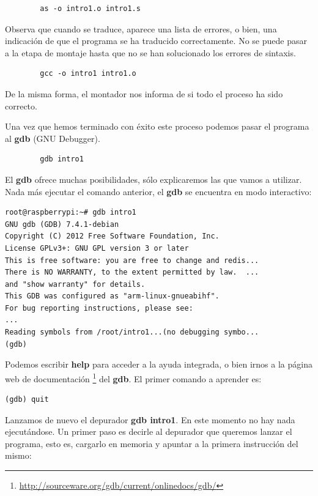 \begin{lstlisting}
        as -o intro1.o intro1.s
\end{lstlisting}

Observa que cuando se traduce, aparece una lista de errores, o bien, una
indicación de que el programa se ha traducido correctamente.
No se puede pasar a la etapa de montaje hasta que no se han solucionado
los errores de sintaxis.

\begin{lstlisting}
        gcc -o intro1 intro1.o
\end{lstlisting}

De la misma forma, el montador nos informa de si todo el proceso ha sido
correcto.

Una vez que hemos terminado con éxito este proceso podemos pasar el programa al
{\bf gdb} (GNU Debugger).

\begin{lstlisting}
        gdb intro1
\end{lstlisting}

El {\bf gdb} ofrece muchas posibilidades, sólo explicaremos las que vamos
a utilizar. Nada más ejecutar el comando anterior, el {\bf gdb} se encuentra
en modo interactivo:

\begin{lstlisting}
root@raspberrypi:~# gdb intro1
GNU gdb (GDB) 7.4.1-debian
Copyright (C) 2012 Free Software Foundation, Inc.
License GPLv3+: GNU GPL version 3 or later 
This is free software: you are free to change and redis...
There is NO WARRANTY, to the extent permitted by law.  ...
and "show warranty" for details.
This GDB was configured as "arm-linux-gnueabihf".
For bug reporting instructions, please see:
...
Reading symbols from /root/intro1...(no debugging symbo...
(gdb)
\end{lstlisting}

Podemos escribir {\bf help} para acceder a la ayuda integrada, o bien
irnos a la página web de documentación
\footnote{\url{http://sourceware.org/gdb/current/onlinedocs/gdb/}}
del {\bf gdb}. El primer comando a aprender es:

\begin{lstlisting}
(gdb) quit
\end{lstlisting}

Lanzamos de nuevo el depurador {\bf gdb intro1}. En este momento no hay
nada ejecutándose. Un primer paso es decirle al depurador que queremos
lanzar el programa, esto es, cargarlo en memoria y apuntar a la primera
instrucción del mismo:

